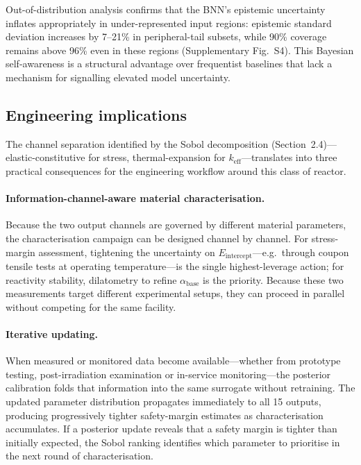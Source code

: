 \documentclass[11pt,a4paper]{article}
\newcommand{\keff}{\ensuremath{k_{\mathrm{eff}}}}
\newcommand{\Eint}{\ensuremath{E_{\mathrm{intercept}}}}
\newcommand{\abase}{\ensuremath{\alpha_{\mathrm{base}}}}
\begin{document}
Out-of-distribution analysis confirms that the BNN's epistemic
uncertainty inflates appropriately in under-represented input regions:
epistemic standard deviation increases by 7--21\% in peripheral-tail
subsets, while 90\% coverage remains above 96\% even in these regions
(Supplementary Fig.~S4). This Bayesian self-awareness is a structural
advantage over frequentist baselines that lack a mechanism for
signalling elevated model uncertainty.

\subsection{Engineering implications}

The channel separation identified by the Sobol decomposition
(Section~2.4)---elastic-constitutive for stress, thermal-expansion
for \keff{}---translates into three practical consequences for the
engineering workflow around this class of reactor.

\paragraph{Information-channel-aware material characterisation.}
Because the two output channels are governed by different material
parameters, the characterisation campaign can be designed channel by
channel. For stress-margin assessment, tightening the uncertainty on
\Eint{}---e.g.\ through coupon tensile tests at operating
temperature---is the single highest-leverage action; for reactivity
stability, dilatometry to refine \abase{} is the priority. Because
these two measurements target different experimental setups, they can
proceed in parallel without competing for the same facility.

\paragraph{Iterative updating.}
When measured or monitored data become available---whether from prototype
testing, post-irradiation examination or in-service monitoring---the
posterior calibration folds that information into the same surrogate
without retraining. The updated parameter distribution propagates
immediately to all 15 outputs, producing progressively tighter
safety-margin estimates as characterisation accumulates. If a posterior
update reveals that a safety margin is tighter than initially expected,
the Sobol ranking identifies which parameter to prioritise in the next
round of characterisation.
\end{document}

